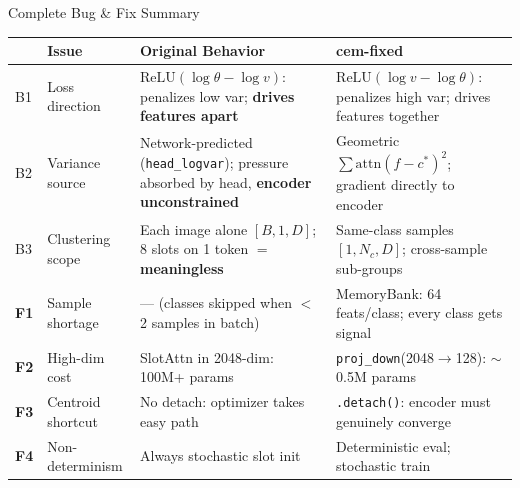 \documentclass[aspectratio=169, 10pt]{beamer}
\newcommand{\fix}[1]{\textcolor{goodgreen}{\textbf{#1}}}
\newcommand{\code}[1]{\texttt{\small #1}}
\newcommand{\good}[1]{\textcolor{goodgreen}{#1}}
\newcommand{\bad}[1]{\textcolor{bugred}{#1}}
\begin{document}
\begin{frame}{Complete Bug \& Fix Summary}

\begin{center}
\scriptsize\setlength{\tabcolsep}{3pt}
\renewcommand{\arraystretch}{1.05}
\begin{tabular}{p{0.4cm}p{2.3cm}p{4.8cm}p{4.8cm}}
\toprule
& \textbf{Issue} & \textbf{Original Behavior} & \textbf{cem-fixed} \\
\midrule
\rowcolor{red!6}
\bad{B1} & Loss direction & $\text{ReLU}(\log\theta - \log v)$: penalizes low var; \textbf{drives features apart} & $\text{ReLU}(\log v - \log\theta)$: penalizes high var; \good{drives features together} \\
\rowcolor{red!6}
\bad{B2} & Variance source & Network-predicted (\code{head\_logvar}); pressure absorbed by head, \textbf{encoder unconstrained} & Geometric $\sum\text{attn}(f-c^*)^2$; \good{gradient directly to encoder} \\
\rowcolor{red!6}
\bad{B3} & Clustering scope & Each image alone $[B,1,D]$; 8 slots on 1 token $=$ \textbf{meaningless} & Same-class samples $[1,N_c,D]$; \good{cross-sample sub-groups} \\
\midrule
\rowcolor{green!5}
\fix{F1} & Sample shortage & --- (classes skipped when $<$2 samples in batch) & MemoryBank: 64 feats/class; \good{every class gets signal} \\
\rowcolor{green!5}
\fix{F2} & High-dim cost & SlotAttn in 2048-dim: \bad{100M+ params} & \code{proj\_down}(2048$\to$128): \good{$\sim$0.5M params} \\
\rowcolor{green!5}
\fix{F3} & Centroid shortcut & No detach: optimizer takes easy path & \code{.detach()}: \good{encoder must genuinely converge} \\
\rowcolor{green!5}
\fix{F4} & Non-determinism & Always stochastic slot init & \good{Deterministic eval; stochastic train} \\
\bottomrule
\end{tabular}
\end{center}

\end{frame}

\end{document}
